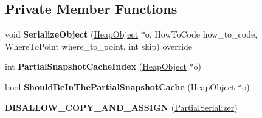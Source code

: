 \subsection*{Private Member Functions}
\begin{DoxyCompactItemize}
\item 
void {\bfseries Serialize\+Object} (\hyperlink{classv8_1_1internal_1_1_heap_object}{Heap\+Object} $\ast$o, How\+To\+Code how\+\_\+to\+\_\+code, Where\+To\+Point where\+\_\+to\+\_\+point, int skip) override\hypertarget{classv8_1_1internal_1_1_partial_serializer_a9096cf7012e1b7ed5229e54b6e7198c3}{}\label{classv8_1_1internal_1_1_partial_serializer_a9096cf7012e1b7ed5229e54b6e7198c3}

\item 
int {\bfseries Partial\+Snapshot\+Cache\+Index} (\hyperlink{classv8_1_1internal_1_1_heap_object}{Heap\+Object} $\ast$o)\hypertarget{classv8_1_1internal_1_1_partial_serializer_a2bd9e09d10512a1147416f406b67d564}{}\label{classv8_1_1internal_1_1_partial_serializer_a2bd9e09d10512a1147416f406b67d564}

\item 
bool {\bfseries Should\+Be\+In\+The\+Partial\+Snapshot\+Cache} (\hyperlink{classv8_1_1internal_1_1_heap_object}{Heap\+Object} $\ast$o)\hypertarget{classv8_1_1internal_1_1_partial_serializer_ad43d77fb4d2db24d7b64198aa39c244e}{}\label{classv8_1_1internal_1_1_partial_serializer_ad43d77fb4d2db24d7b64198aa39c244e}

\item 
{\bfseries D\+I\+S\+A\+L\+L\+O\+W\+\_\+\+C\+O\+P\+Y\+\_\+\+A\+N\+D\+\_\+\+A\+S\+S\+I\+GN} (\hyperlink{classv8_1_1internal_1_1_partial_serializer}{Partial\+Serializer})\hypertarget{classv8_1_1internal_1_1_partial_serializer_afb042f93a992d6f86914a7366f516d9d}{}\label{classv8_1_1internal_1_1_partial_serializer_afb042f93a992d6f86914a7366f516d9d}

\end{DoxyCompactItemize}
